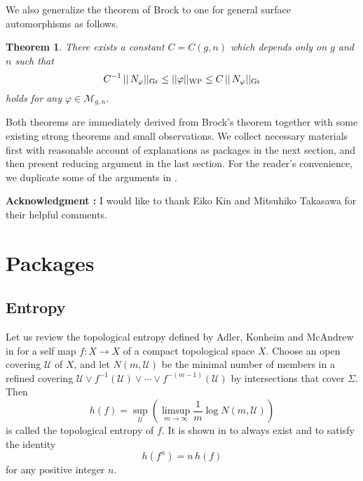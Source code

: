 \documentclass[11pt,reqno]{amsart}
\newtheorem{theorem}{{\bf Theorem}}
\numberwithin{equation}{section}
\begin{document}
We also generalize the theorem of Brock to one for 
general surface automorphisms as follows.  

\begin{theorem}\label{Thm:2}
There exists a constant  $C = C(g, n)$  which depends only on  $g$  and  $n$  
such that 
\begin{equation*}
	C^{-1} \, || \, N_{\varphi} ||_{{\rm Gr}} 
	\leq || \varphi ||_{{\rm WP}} 
	\leq C \, || \, N_{\varphi} ||_{{\rm Gr}} 
\end{equation*} 
holds for any  $\varphi \in \mathcal{M}_{g,n}$.   
\end{theorem}

Both theorems are immediately derived from Brock's theorem together with 
some existing strong theorems and small observations.  
We collect necessary materials first with reasonable account 
of explanations as packages in the next section,  
and then present reducing argument in the last section.  
For the reader's convenience, 
we duplicate some of the arguments in  \cite{KKT}.  
\medskip 

\noindent 
{\bf Acknowledgment :} 
I would like to thank Eiko Kin and Mitsuhiko Takasawa 
for their helpful comments.  

\section{Packages} 

\subsection{Entropy} 

Let us review the topological entropy defined by 
Adler, Konheim and McAndrew in  \cite{AKM}  
for a self map  $f : X \to X$  of a compact topological space  $X$.  
Choose an open covering  $\mathcal{U}$  of  $X$,  
and 
let  $N(m, \mathcal{U})$  be the minimal number of members 
in a refined covering  
$\mathcal{U} \vee f^{-1}(\mathcal{U}) \vee \cdots \vee f^{-(m-1)}(\mathcal{U})$  
by intersections  
that cover  $\varSigma$.  
Then  
\begin{equation*}
	h(f) = \sup_{\mathcal{U}} \left( \limsup_{m \to \infty} \frac{1}{m} \log N(m, \mathcal{U}) \right)
\end{equation*}
is called the topological entropy of  $f$.  
It is shown in  \cite{AKM}  to always exist and 
to satisfy the identity  
\begin{equation*} 
	h(f^n) = n \, h(f)
\end{equation*}   
for any positive integer  $n$.  
\end{document}
